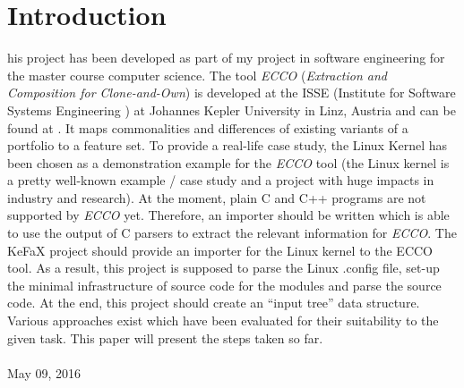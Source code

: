 \section{Introduction}
his project has been developed as part of my project in software engineering for the master course computer science.
The tool {\it ECCO}
({\it Extraction and Composition for Clone-and-Own})\cite{fischer2014enhancing}
is developed at the ISSE (Institute for Software Systems Engineering \cite{ISSE_URL})
at Johannes Kepler University in Linz, Austria 
and can be found at \cite{ecourl}.
It maps commonalities and differences of existing variants 
of a portfolio to a feature set.
To provide a real-life case study, the Linux Kernel has been chosen as a 
demonstration example for the {\it ECCO} tool 
(the Linux kernel is a pretty well-known example / case study 
and a project with huge impacts in industry and research).
At the moment, plain C and C++ programs are not supported by {\it ECCO} yet.
Therefore, an importer should be written which is
able to use the output of C parsers to extract the relevant information
for {\it ECCO}. 
The  KeFaX project should provide an importer for the Linux kernel to the ECCO tool. 
As a result,
this project is supposed to parse the Linux .config file, 
set-up the minimal infrastructure of source code for the modules and 
parse the source code. At the end, this project should create an ``input tree'' data
structure. 
Various approaches exist which have been evaluated
for their suitability to the given task. 
This paper will present the steps taken so far.
\\ \ \\
\hfill May 09, 2016
